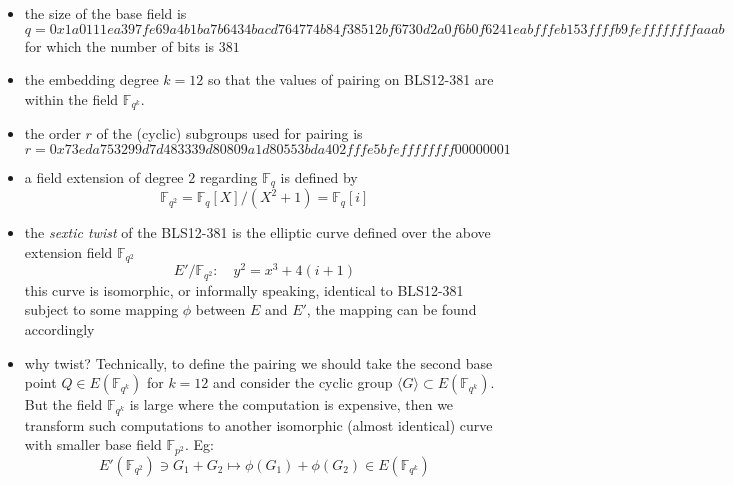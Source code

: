 \documentclass{article}
\begin{document}
\begin{itemize}
\item the size of the base field is
\begin{equation*}
q= 0x1a0111ea397fe69a4b1ba7b6434bacd764774b84f38512bf6730d2a0f6b0f6241eabfffeb153ffffb9feffffffffaaab
\end{equation*}
for which the number of bits is $381$
\item the embedding degree $k = 12$ so that the values of pairing on BLS12-381 are within the field $\mathbb{F}_{q^k}$. 
\item the order $r$ of the (cyclic) subgroups used for pairing is
\begin{equation*}
r = 0x73eda753299d7d483339d80809a1d80553bda402fffe5bfeffffffff00000001
\end{equation*}
\item a field extension of degree $2$ regarding $\mathbb{F}_q$ is defined by 
\begin{equation*}
\mathbb{F}_{q^2} = \mathbb{F}_q[X] / (X^2 + 1) = \mathbb{F}_q[i]
\end{equation*}
\item the \textit{sextic twist} of the BLS12-381 is the elliptic curve defined over the above extension field $\mathbb{F}_{q^2}$
\begin{equation*}
E' / \mathbb{F}_{q^2}: \quad y^2 = x^3 + 4(i + 1)
\end{equation*}
this curve is isomorphic, or informally speaking, identical to BLS12-381 subject to some mapping $\phi$ between $E$ and $E'$, the mapping can be found accordingly 
\item why twist? Technically, to define the pairing we should take the second base point $Q \in E(\mathbb{F}_{q^k})$ for $k = 12$ and consider the cyclic group $\langle G \rangle \subset E(\mathbb{F}_{q^k})$. But the field $\mathbb{F}_{q^k}$ is large where the computation is expensive, then we transform such computations to another isomorphic (almost identical) curve with smaller base field $\mathbb{F}_{p^2}$. Eg:
\begin{equation*}
E'(\mathbb{F}_{q^2}) \ni G_1 + G_2 \mapsto \phi(G_1) + \phi(G_2) \in E(\mathbb{F}_{q^k})
\end{equation*}
\end{itemize}
\end{document}

